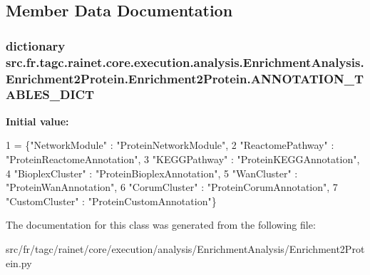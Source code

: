 \subsection{Member Data Documentation}
\hypertarget{classsrc_1_1fr_1_1tagc_1_1rainet_1_1core_1_1execution_1_1analysis_1_1EnrichmentAnalysis_1_1Enric6c627eb5bd04b7c51c1ec93bc189786a_a9e4991e3f642f90ca9faf554e59c8301}{
\subsubsection[{A\-N\-N\-O\-T\-A\-T\-I\-O\-N\-\_\-\-T\-A\-B\-L\-E\-S\-\_\-\-D\-I\-C\-T}]{\setlength{\rightskip}{0pt plus 5cm}dictionary src.\-fr.\-tagc.\-rainet.\-core.\-execution.\-analysis.\-Enrichment\-Analysis.\-Enrichment2\-Protein.\-Enrichment2\-Protein.\-A\-N\-N\-O\-T\-A\-T\-I\-O\-N\-\_\-\-T\-A\-B\-L\-E\-S\-\_\-\-D\-I\-C\-T\hspace{0.3cm}{\ttfamily [static]}}}\label{classsrc_1_1fr_1_1tagc_1_1rainet_1_1core_1_1execution_1_1analysis_1_1EnrichmentAnalysis_1_1Enric6c627eb5bd04b7c51c1ec93bc189786a_a9e4991e3f642f90ca9faf554e59c8301}
{\bfseries Initial value\-:}
\begin{DoxyCode}
1 = \{\textcolor{stringliteral}{"NetworkModule"} : \textcolor{stringliteral}{"ProteinNetworkModule"},
2                               \textcolor{stringliteral}{"ReactomePathway"} : \textcolor{stringliteral}{"ProteinReactomeAnnotation"},
3                               \textcolor{stringliteral}{"KEGGPathway"} : \textcolor{stringliteral}{"ProteinKEGGAnnotation"},
4                               \textcolor{stringliteral}{"BioplexCluster"} : \textcolor{stringliteral}{"ProteinBioplexAnnotation"},
5                               \textcolor{stringliteral}{"WanCluster"} : \textcolor{stringliteral}{"ProteinWanAnnotation"},
6                               \textcolor{stringliteral}{"CorumCluster"} : \textcolor{stringliteral}{"ProteinCorumAnnotation"},
7                               \textcolor{stringliteral}{"CustomCluster"} : \textcolor{stringliteral}{"ProteinCustomAnnotation"}\}
\end{DoxyCode}


The documentation for this class was generated from the following file\-:\begin{DoxyCompactItemize}
\item 
src/fr/tagc/rainet/core/execution/analysis/\-Enrichment\-Analysis/Enrichment2\-Protein.\-py\end{DoxyCompactItemize}
